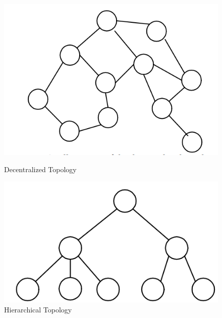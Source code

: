 \documentclass{article}
\begin{document}
\begin{figure}[!ht]
\begin{minipage}{0.45\textwidth}
        \includegraphics[scale=0.3]{decentralized.png} %
        \caption{Decentralized Topology}
    \end{minipage}\hfill
    \begin{minipage}{0.45\textwidth}
        \centering
        \includegraphics[scale=0.3]{hierarchical.png} %
        \caption{Hierarchical Topology}
    \end{minipage}
\end{figure}
\end{document}
